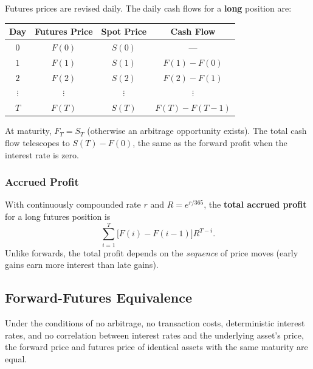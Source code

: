 Futures prices are revised daily. The daily cash flows for a \textbf{long} position are:

\begin{center}
\begin{tabular}{cccc}
  \hline
  Day & Futures Price & Spot Price & Cash Flow \\
  \hline
  $0$ & $F(0)$ & $S(0)$ & --- \\
  $1$ & $F(1)$ & $S(1)$ & $F(1)-F(0)$ \\
  $2$ & $F(2)$ & $S(2)$ & $F(2)-F(1)$ \\
  $\vdots$ & $\vdots$ & $\vdots$ & $\vdots$ \\
  $T$ & $F(T)$ & $S(T)$ & $F(T)-F(T-1)$ \\
  \hline
\end{tabular}
\end{center}

\begin{remark}
  At maturity, $F_T = S_T$ (otherwise an arbitrage opportunity exists). The total cash flow telescopes to $S(T) - F(0)$, the same as the forward profit when the interest rate is zero.
\end{remark}

\subsubsection{Accrued Profit}

With continuously compounded rate $r$ and $R = e^{r/365}$, the \textbf{total accrued profit} for a long futures position is
\[
  \sum_{i=1}^T \bigl[F(i) - F(i-1)\bigr] R^{T-i}.
\]
Unlike forwards, the total profit depends on the \emph{sequence} of price moves (early gains earn more interest than late gains).

\subsection{Forward-Futures Equivalence}

\begin{theorem}
  Under the conditions of no arbitrage, no transaction costs, deterministic interest rates, and no correlation between interest rates and the underlying asset's price, the forward price and futures price of identical assets with the same maturity are equal.
\end{theorem}

